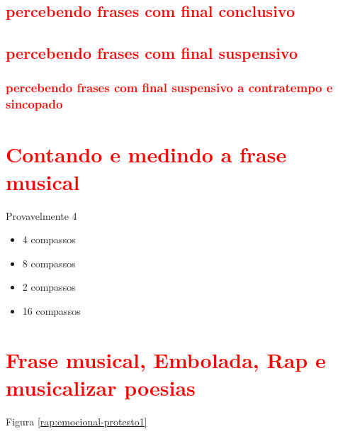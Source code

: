 \subsection{\textcolor{red}{percebendo frases com final conclusivo}}

\subsection{\textcolor{red}{percebendo frases com final suspensivo}}


\subsubsection{\textcolor{red}{percebendo frases com final suspensivo a contratempo e sincopado}}

\section{\textcolor{red}{Contando e medindo a frase musical}}
Provavelmente 4
\begin{itemize}
\item 4 compassos
\item 8 compassos
\item 2 compassos
\item 16 compassos
\end{itemize}

\section{\textcolor{red}{Frase musical, Embolada, Rap e musicalizar poesias}}
Figura \ref{rap:emocional-protesto1}

